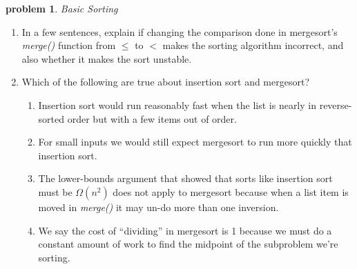 \documentclass[10pt]{article}
\newcommand{\altsolution}[1]{}
\newtheorem{problem}{\sc\color{cit}problem}
\begin{document}
\begin{enumerate}
            \altsolution{A second way to solve this is to use the limit definition for order classes: \\
            if $f(n) \in O(g(n))$ then $\displaystyle \lim_{n \rightarrow\infty} \frac{f(n)}{g(n)} = c$ where $c\leq \infty$.
           \begin{align*}
             \lim_{n \rightarrow\infty} \frac{ n (\log n)^2 }{ n^{1.5}\log n }
              & =  \lim_{n \rightarrow\infty} \frac{\log n}{ n^{0.5}}  && \text{\qquad(cancel terms)} \\
              & =  \lim_{n \rightarrow\infty} \frac{k/n}{ (1/2)n^{-0.5}} && \text{\qquad(apply L’Hopital’s rule)} \\
               & =  \lim_{n \rightarrow\infty} \frac{2k}{ n^{0.5}} && \text{\qquad(simplify)} \\
               & = 0 && \text{\qquad(limit of a constant over function of n is zero)} \\
         \end{align*}
            Therefore  therefore $n (\log n)^2 \in O(n^{1.5}\log n)$ (and in fact it's in ``little-oh'' and grows more slowly).
          }
            
    \end{enumerate}

\begin{problem} Basic Sorting \end{problem}
    \begin{enumerate}   
    	\item In a few sentences, explain if changing the comparison done in mergesort's \emph{merge()} function from $\leq$ to $<$ makes the sorting algorithm incorrect, and also whether it makes the sort unstable.
    	
    	\item Which of the following are true about insertion sort and mergesort?
    		\begin{enumerate} 
    		\item Insertion sort would run reasonably fast when the list is nearly in reverse-sorted order but with a few items out of order.
    		\item For small inputs we would still expect mergesort to run more quickly that insertion sort.
    		\item The lower-bounds argument that showed that sorts like insertion sort must be $\Omega(n^2)$ does not apply to mergesort because when a list item
    		is moved in \emph{merge()} it may un-do more than one inversion.    
    		\item We say the cost of ``dividing'' in mergesort is 1 because we must do a constant amount of work to find the midpoint of the subproblem we're sorting.
		\end{enumerate} 
    	
    \end{enumerate}       	
\end{document}

